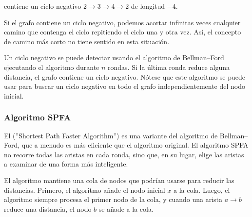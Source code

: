 \begin{center}
\end{center}
\noindent
contiene un ciclo negativo
$2 \rightarrow 3 \rightarrow 4 \rightarrow 2$
de longitud $-4$.

Si el grafo contiene un ciclo negativo,
podemos acortar infinitas veces
cualquier camino que contenga el ciclo repitiendo el ciclo
una y otra vez.
Así, el concepto de camino más corto
no tiene sentido en esta situación.

Un ciclo negativo se puede detectar
usando el algoritmo de Bellman–Ford
ejecutando el algoritmo durante $n$ rondas.
Si la última ronda reduce alguna distancia,
el grafo contiene un ciclo negativo.
Nótese que este algoritmo se puede usar para
buscar
un ciclo negativo en todo el grafo
independientemente del nodo inicial.

\subsubsection{Algoritmo SPFA}


El  (''Shortest Path Faster Algorithm'') \cite{fan94}
es una variante del algoritmo de Bellman–Ford,
que a menudo es más eficiente que el algoritmo original.
El algoritmo SPFA no recorre todas las aristas en cada ronda,
sino que, en su lugar, elige las aristas a examinar
de una forma más inteligente.

El algoritmo mantiene una cola de nodos que podrían
usarse para reducir las distancias.
Primero, el algoritmo añade el nodo inicial $x$
a la cola.
Luego, el algoritmo siempre procesa el
primer nodo de la cola, y cuando una arista
$a \rightarrow b$ reduce una distancia,
el nodo $b$ se añade a la cola.
%
%

